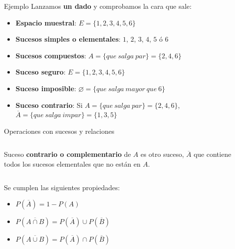 \documentclass[11pt,handout]{beamer}
\begin{document}
\begin{frame}{Ejemplo}
Lanzamos \textbf{un dado} y comprobamos la cara que sale:
\begin{itemize}[<+->]
\item \textbf{Espacio muestral}: $E=\lbrace 1,2,3,4,5,6 \rbrace $
\item \textbf{Sucesos simples o elementales}: $1$, $2$, $3$, $4$, $5$ ó $6$
\item \textbf{Sucesos compuestos}: $A=\lbrace que\ salga\ par\rbrace=\lbrace2,4,6\rbrace$
\item \textbf{Suceso seguro}: $E=\lbrace 1,2,3,4,5,6 \rbrace $
\item \textbf{Suceso imposible}: $\varnothing=\lbrace que\ salga \ mayor \ que \ 6\rbrace$
\item \textbf{Suceso contrario}: Si $A=\lbrace que\ salga\ par\rbrace=\lbrace2,4,6\rbrace$, $\overline{A}=\lbrace que\ salga\ impar\rbrace=\lbrace1,3,5\rbrace$ 
\end{itemize}
\end{frame}
\begin{frame}
{Operaciones con sucesos y relaciones}
\begin{columns}
\begin{column}{0.7\textwidth}
\begin{block}{}
Suceso \textbf{contrario o complementario} de $A$ es otro suceso, $\overline{A}$ que contiene todos los sucesos elementales que no están en $A$.
\end{block}

\end{column}
\begin{column}{0.3\textwidth}
\scalebox{.7}{}

\end{column}
\end{columns}

Se cumplen las siguientes propiedades:

\begin{itemize}
\item $P(\overline{A})=1-P(A)$
\item $P(\overline{A \cap B})=P(\overline{A})\cup P(\overline{B})$
\item $P(\overline{A \cup B})=P(\overline{A})\cap P(\overline{B})$
\end{itemize}



\end{frame}
\end{document}
